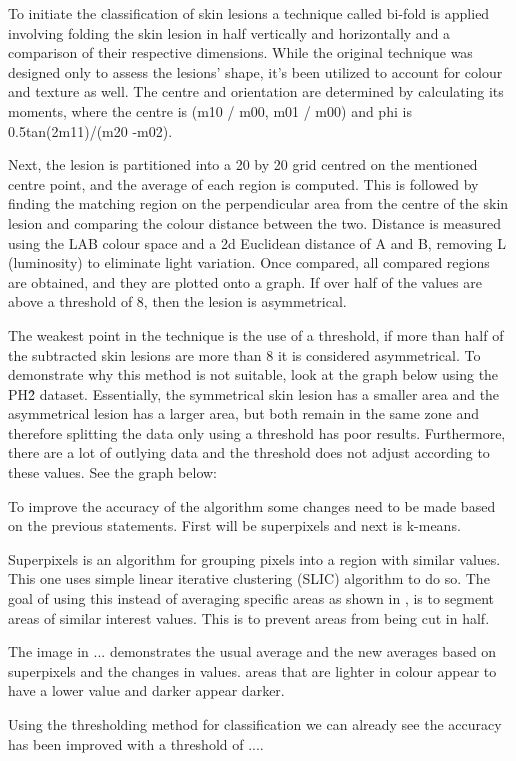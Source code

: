 To initiate the classification of skin lesions a technique called bi-fold is applied involving folding the skin lesion in half vertically and horizontally and a comparison of their respective dimensions. While the original technique was designed only to assess the lesions' shape, it's been utilized to account for colour and texture as well. The centre and orientation are determined by calculating its moments, where the centre is (m10 / m00, m01 / m00) and phi is 0.5tan(2m11)/(m20 -m02). 

Next, the lesion is partitioned into a 20 by 20 grid centred on the mentioned centre point, and the average of each region is computed. This is followed by finding the matching region on the perpendicular area from the centre of the skin lesion and comparing the colour distance between the two. Distance is measured using the LAB colour space and a 2d Euclidean distance of A and B, removing L (luminosity) to eliminate light variation. Once compared, all compared regions are obtained, and they are plotted onto a graph. If over half of the values are above a threshold of 8, then the lesion is asymmetrical.

The weakest point in the technique is the use of a threshold, if more than half of the subtracted skin lesions are more than 8 it is considered asymmetrical. To demonstrate why this method is not suitable, look at the graph below using the PH\^2 dataset. Essentially, the symmetrical skin lesion has a smaller area and the asymmetrical lesion has a larger area, but both remain in the same zone and therefore splitting the data only using a threshold has poor results. Furthermore, there are a lot of outlying data and the threshold does not adjust according to these values. See the graph below:


To improve the accuracy of the algorithm some changes need to be made based on the previous statements. First will be superpixels and next is k-means.

Superpixels is an algorithm for grouping pixels into a region with similar values. This one uses simple linear iterative clustering (SLIC) algorithm \cite{} to do so. The goal of using this instead of averaging specific areas as shown in \cite{}, is to segment areas of similar interest values. This is to prevent areas from being cut in half.

The image in ... demonstrates the usual average and the new averages based on superpixels and the changes in values. areas that are lighter in colour appear to have a lower value and darker appear darker.

Using the thresholding method for classification we can already see the accuracy has been improved with a threshold of ....